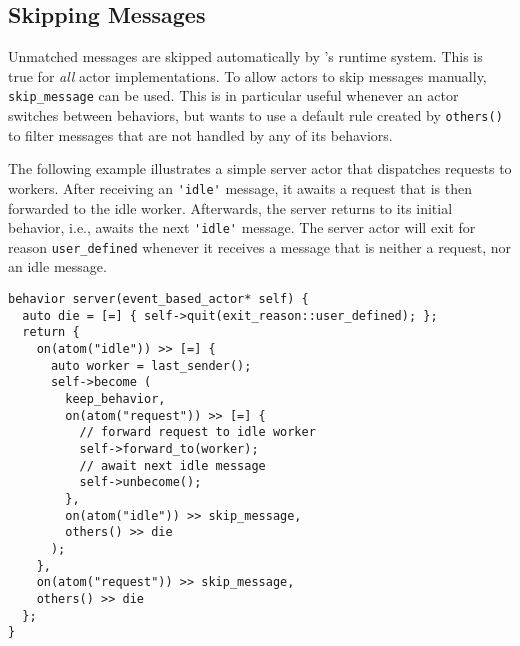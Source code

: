 \clearpage
\subsection{Skipping Messages}

Unmatched messages are skipped automatically by \lib's runtime system.
This is true for \textit{all} actor implementations.
To allow actors to skip messages manually, \lstinline^skip_message^ can be used.
This is in particular useful whenever an actor switches between behaviors, but wants to use a default rule created by \lstinline^others()^ to filter messages that are not handled by any of its behaviors.

The following example illustrates a simple server actor that dispatches requests to workers.
After receiving an \lstinline^'idle'^ message, it awaits a request that is then forwarded to the idle worker.
Afterwards, the server returns to its initial behavior, i.e., awaits the next \lstinline^'idle'^ message.
The server actor will exit for reason \lstinline^user_defined^ whenever it receives a message that is neither a request, nor an idle message.

\begin{lstlisting}
behavior server(event_based_actor* self) {
  auto die = [=] { self->quit(exit_reason::user_defined); };
  return {
    on(atom("idle")) >> [=] {
      auto worker = last_sender();
      self->become (
        keep_behavior,
        on(atom("request")) >> [=] {
          // forward request to idle worker
          self->forward_to(worker);
          // await next idle message
          self->unbecome();
        },
        on(atom("idle")) >> skip_message,
        others() >> die
      );
    },
    on(atom("request")) >> skip_message,
    others() >> die
  };
}
\end{lstlisting}
